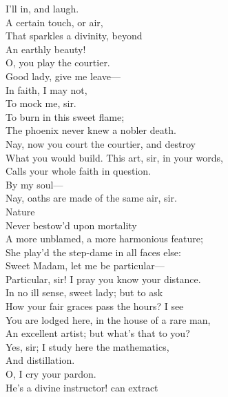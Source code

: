 \documentclass[a4paper,oneside]{memoir}
\begin{document}
\begin{drama*}
\facespeaks {} I'll in, and laugh.\\
\mammonspeaks {} A certain touch, or air,\\
That sparkles a divinity, beyond\\
An earthly beauty!\\
\dolspeaks {} O, you play the courtier.\\
\mammonspeaks Good lady, give me leave---\\
\dolspeaks {} In faith, I may not,\\
To mock me, sir.\\
\mammonspeaks {} To burn in this sweet flame;\\
The phoenix never knew a nobler death.\\
\dolspeaks Nay, now you court the courtier, and destroy\\
What you would build. This art, sir, in your words,\\
Calls your whole faith in question.\\
\mammonspeaks {} By my soul---\\
\dolspeaks Nay, oaths are made of the same air, sir.\\
\mammonspeaks {} Nature\\
Never bestow'd upon mortality\\
A more unblamed, a more harmonious feature;\\
She play'd the step-dame in all faces else:\\
Sweet Madam, let me be particular---\\
\dolspeaks Particular, sir! I pray you know your distance.\\
\mammonspeaks In no ill sense, sweet lady; but to ask\\
How your fair graces pass the hours? I see\\
You are lodged here, in the house of a rare man,\\
An excellent artist; but what's that to you?\\
\dolspeaks Yes, sir; I study here the mathematics,\\
And distillation.\\
\mammonspeaks {} O, I cry your pardon.\\
He's a divine instructor! can extract\\

\end{drama*}
\end{document}
